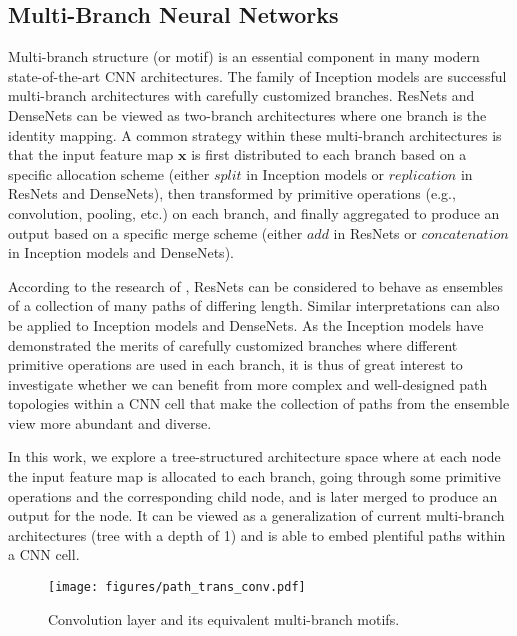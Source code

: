 \documentclass{article}
\newcommand{\bs}{\boldsymbol}
\newcommand{\bx}{\bs{x}}
\begin{document}
\subsection{Multi-Branch Neural Networks}\label{sec:multi_branch}
Multi-branch structure (or motif) is an essential component in many modern state-of-the-art CNN architectures. The family of Inception models \cite{szegedy2015going,szegedy2017inception,szegedy2016rethinking} are successful multi-branch architectures with carefully customized branches.  
ResNets \cite{he2016deep} and DenseNets \cite{huang2016densely} can be viewed as two-branch architectures where one branch is the identity mapping. 
A common strategy within these multi-branch architectures is that the input feature map $\bx$ is first distributed to each branch based on a specific allocation scheme (either $split$ in Inception models or $replication$ in ResNets and DenseNets), then transformed by primitive operations (e.g., convolution, pooling, etc.) on each branch, and finally aggregated to produce an output based on a specific merge scheme (either $add$ in ResNets or $concatenation$ in Inception models and DenseNets).


According to the research of \citet{veit2016residual}, ResNets can be considered to behave as ensembles of a collection of many paths of differing length. Similar interpretations can also be applied to Inception models and DenseNets. As the Inception models have demonstrated the merits of carefully customized branches where different primitive operations are used in each branch, it is thus of great interest to investigate whether we can benefit from more complex and well-designed path topologies within a CNN cell that make the collection of paths from the ensemble view more abundant and diverse.

In this work, we explore a tree-structured architecture space where at each node the input feature map is allocated to each branch, going through some primitive operations and the corresponding child node, and is later merged to produce an output for the node. It can be viewed as a generalization of current multi-branch architectures (tree with a depth of 1) and is able to embed plentiful paths within a CNN cell. 

\begin{figure}[t]
	\centering
	\texttt{[image: figures/path\_trans\_conv.pdf]}
	\caption{Convolution layer and its equivalent multi-branch motifs.}
	\label{fig:path_trans_conv}
\end{figure}
\end{document}
